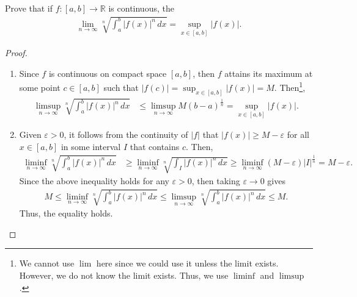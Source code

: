 \documentclass[11pt]{article}
\theoremstyle{definition}
\numberwithin{equation}{subsection}
\begin{document}
\cite{4}
Prove that if $f: [a,b] \to \mathbb{R}$ is continuous, the 
\begin{align*}
    \lim_{n\to\infty} \sqrt[n]{\int^b_a |f(x)|^n\, dx} = \sup_{x\in[a,b]} |f(x)|.
\end{align*}
\begin{proof}
~\begin{enumerate}[label=(\alph*)]
    \item Since $f$ is continuous on compact space $[a,b]$, then $f$ attains its maximum at some point $c \in [a,b]$ such that $|f(c)| = \sup_{x\in[a,b]} |f(x)| = M$. Then\footnote{We cannot use $\lim$ here since we could use it unless the limit exists. However, we do not know the limit exists. Thus, we use $\liminf$ and $\limsup$.},
    \begin{align*}
        \limsup_{n\to\infty} \sqrt[n]{\int^b_a |f(x)|^n\, dx} & \leq \limsup_{n\to\infty} M (b - a)^{\frac{1}{n}} = \sup_{x\in[a,b]} |f(x)|.
    \end{align*}
    
    \item Given $\varepsilon > 0$, it follows from the continuity of $|f|$ that $|f(x)| \geq M - \varepsilon$ for all $x \in [a,b]$ in some interval $I$ that contains $c$. Then,
    \begin{align*}
        \liminf_{n\to\infty} \sqrt[n]{\int^b_a |f(x)|^n\, dx} & \geq  \liminf_{n\to\infty} \sqrt[n]{\int_I |f(x)|^n\, dx} \geq \liminf_{n\to\infty} (M - \varepsilon) |I|^{\frac{1}{n}} = M - \varepsilon.
    \end{align*}
    Since the above inequality holds for any $\varepsilon > 0$, then taking $\varepsilon \to 0$ gives
    \begin{align*}
        M \leq \liminf_{n\to\infty} \sqrt[n]{\int^b_a |f(x)|^n\, dx} \leq \limsup_{n\to\infty} \sqrt[n]{\int^b_a |f(x)|^n\, dx} \leq M.
    \end{align*}
    Thus, the equality holds.
\end{enumerate}
\end{proof}

\medskip
\end{document}

